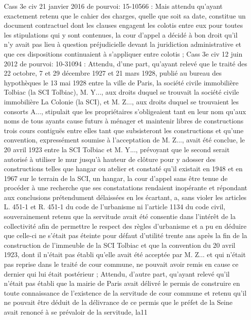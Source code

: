 \documentclass[11pt,a4paper]{report}
\begin{document}
	Cass 3e civ 21 janvier 2016 \No  de pourvoi: 15-10566 : Mais attendu qu'ayant exactement retenu que le cahier
	des charges, quelle que soit sa date, constitue un document contractuel dont les clauses engagent les colotis
	entre eux pour toutes les stipulations qui y sont contenues, la cour d'appel a décidé à bon droit qu'il n'y avait pas
	lieu à question préjudicielle devant la juridiction administrative et que ces dispositions continuaient à
	s'appliquer entre colotis ;
	Cass 3e civ 12 juin 2012 \No  de pourvoi: 10-31094 : Attendu, d'une part, qu'ayant relevé que le traité des 22
	octobre, 7 et 29 décembre 1927 et 21 mars 1928, publié au bureau des hypothèques le 13 mai 1928 entre la ville
	de Paris, la société civile immobilière Tolbiac (la SCI Tolbiac), M. Y..., aux droits duquel se trouvait la société
	civile immobilière La Colonie (la SCI), et M. Z..., aux droits duquel se trouvaient les consorts A..., stipulait que
	les propriétaires s'obligeaient tant en leur nom qu'aux noms de tous ayants cause futurs à ménager et maintenir
	libres de constructions trois cours contiguës entre elles tant que subsisteront les constructions et qu'une
	convention, expressément soumise à l'acceptation de M. Z..., avait été conclue, le 20 avril 1923 entre la SCI
	Tolbiac et M. Y..., prévoyant que le second serait autorisé à utiliser le mur jusqu'à hauteur de clôture pour y
	adosser des constructions telles que hangar ou atelier et constaté qu'il existait en 1948 et en 1967 sur le terrain
	de la SCI, un hangar, la cour d'appel sans être tenue de procéder à une recherche que ses constatations
	rendaient inopérante et répondant aux conclusions prétendument délaissées en les écartant, a, sans violer les
	articles L. 451-1 et R. 451-1 du code de l'urbanisme ni l'article 1134 du code civil, souverainement retenu que la
	servitude avait été consentie dans l'intérêt de la collectivité afin de permettre le respect des règles d'urbanisme
	et a pu en déduire que celle-ci ne s'était pas éteinte pour défaut d'utilité trente ans après la fin de la construction
	de l'immeuble de la SCI Tolbiac et que la convention du 20 avril 1923, dont il n'était pas établi qu'elle avait été
	acceptée par M. Z... et qui n'était pas reprise dans le traité de cour commune, ne pouvait avoir remis en cause ce
	dernier qui lui était postérieur ;
	Attendu, d'autre part, qu'ayant relevé qu'il n'était pas établi que la mairie de Paris avait délivré le permis de
	construire en toute connaissance de l'existence de la servitude de cour commune et retenu qu'il ne pouvait être
	déduit de la délivrance de ce permis que le préfet de la Seine avait renoncé à se prévaloir de la servitude, la11
\end{document}
